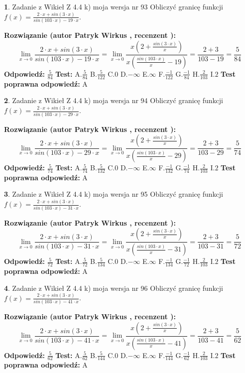 \documentclass[12pt, a4paper]{article}
\theoremstyle{definition} %
\newtheorem{zad}{}
\newcommand{\zadStart}[1]{\begin{zad}#1\newline}
\newcommand{\zadStop}{\end{zad}}
\newcommand{\rozwStart}[2]{\noindent \textbf{Rozwiązanie (autor #1 , recenzent #2): }\newline}
\newcommand{\rozwStop}{\newline}
\newcommand{\odpStart}{\noindent \textbf{Odpowiedź:}\newline}
\newcommand{\odpStop}{\newline}
\newcommand{\testStart}{\noindent \textbf{Test:}\newline}
\newcommand{\testStop}{\newline}
\newcommand{\kluczStart}{\noindent \textbf{Test poprawna odpowiedź:}\newline}
\newcommand{\kluczStop}{\newline}
\begin{document}
\zadStart{Zadanie z Wikieł Z 4.4 k) moja wersja nr 93}
Obliczyć granicę funkcji $f(x)=\frac{2\cdot x +sin(3\cdot x)}{sin(103\cdot x) -19\cdot x}$.
\zadStop
\rozwStart{Patryk Wirkus}{}
$$\lim\limits_{x\to 0}\frac{2\cdot x +sin(3\cdot x)}{sin(103\cdot x) -19\cdot x}
=\lim\limits_{x\to 0}\frac{x(2+\frac{sin(3\cdot x)}{x})}{x(\frac{sin(103\cdot x)}{x}-19)}
=\frac{2+3}{103-19} = \frac{5}{84}$$
\rozwStop
\odpStart
$\frac{5}{84}$
\odpStop
\testStart
A.$\frac{5}{84}$
B.$\frac{5}{122}$
C.$0$
D.$-\infty$
E.$\infty$
F.$\frac{-1}{122}$
G.$\frac{-1}{84}$
H.$\frac{2}{103}$
I.$2$
\testStop
\kluczStart
A
\kluczStop



\zadStart{Zadanie z Wikieł Z 4.4 k) moja wersja nr 94}
Obliczyć granicę funkcji $f(x)=\frac{2\cdot x +sin(3\cdot x)}{sin(103\cdot x) -29\cdot x}$.
\zadStop
\rozwStart{Patryk Wirkus}{}
$$\lim\limits_{x\to 0}\frac{2\cdot x +sin(3\cdot x)}{sin(103\cdot x) -29\cdot x}
=\lim\limits_{x\to 0}\frac{x(2+\frac{sin(3\cdot x)}{x})}{x(\frac{sin(103\cdot x)}{x}-29)}
=\frac{2+3}{103-29} = \frac{5}{74}$$
\rozwStop
\odpStart
$\frac{5}{74}$
\odpStop
\testStart
A.$\frac{5}{74}$
B.$\frac{5}{132}$
C.$0$
D.$-\infty$
E.$\infty$
F.$\frac{-1}{132}$
G.$\frac{-1}{74}$
H.$\frac{2}{103}$
I.$2$
\testStop
\kluczStart
A
\kluczStop



\zadStart{Zadanie z Wikieł Z 4.4 k) moja wersja nr 95}
Obliczyć granicę funkcji $f(x)=\frac{2\cdot x +sin(3\cdot x)}{sin(103\cdot x) -31\cdot x}$.
\zadStop
\rozwStart{Patryk Wirkus}{}
$$\lim\limits_{x\to 0}\frac{2\cdot x +sin(3\cdot x)}{sin(103\cdot x) -31\cdot x}
=\lim\limits_{x\to 0}\frac{x(2+\frac{sin(3\cdot x)}{x})}{x(\frac{sin(103\cdot x)}{x}-31)}
=\frac{2+3}{103-31} = \frac{5}{72}$$
\rozwStop
\odpStart
$\frac{5}{72}$
\odpStop
\testStart
A.$\frac{5}{72}$
B.$\frac{5}{134}$
C.$0$
D.$-\infty$
E.$\infty$
F.$\frac{-1}{134}$
G.$\frac{-1}{72}$
H.$\frac{2}{103}$
I.$2$
\testStop
\kluczStart
A
\kluczStop



\zadStart{Zadanie z Wikieł Z 4.4 k) moja wersja nr 96}
Obliczyć granicę funkcji $f(x)=\frac{2\cdot x +sin(3\cdot x)}{sin(103\cdot x) -41\cdot x}$.
\zadStop
\rozwStart{Patryk Wirkus}{}
$$\lim\limits_{x\to 0}\frac{2\cdot x +sin(3\cdot x)}{sin(103\cdot x) -41\cdot x}
=\lim\limits_{x\to 0}\frac{x(2+\frac{sin(3\cdot x)}{x})}{x(\frac{sin(103\cdot x)}{x}-41)}
=\frac{2+3}{103-41} = \frac{5}{62}$$
\rozwStop
\odpStart
$\frac{5}{62}$
\odpStop
\testStart
A.$\frac{5}{62}$
B.$\frac{5}{144}$
C.$0$
D.$-\infty$
E.$\infty$
F.$\frac{-1}{144}$
G.$\frac{-1}{62}$
H.$\frac{2}{103}$
I.$2$
\testStop
\kluczStart
A
\kluczStop
\end{document}
